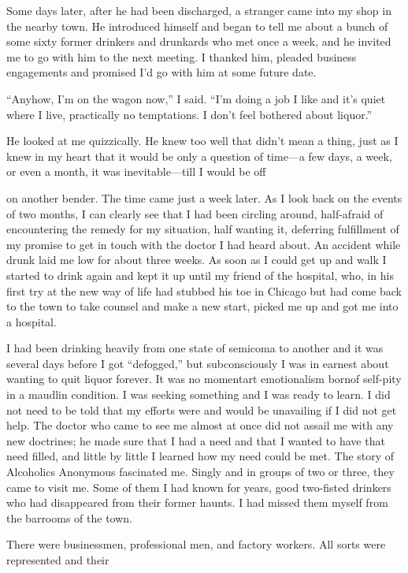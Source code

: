 Some days later, after he had been discharged, a stranger came into my shop in the nearby town. He introduced himself and began to tell me about a bunch of some sixty former drinkers and drunkards who met once a week, and he invited me to go with him to the next meeting. I thanked him, pleaded business engagements and promised I’d go with him at some future date.

“Anyhow, I’m on the wagon now,” I said. “I’m doing a job I like and it’s quiet where I live, practically no temptations. I don’t feel bothered about liquor.”

He looked at me quizzically. He knew too well that didn’t mean a thing, just as I knew in my heart that it would be only a question of time—a few days, a week, or even a month, it was inevitable—till I would be off

on another bender. The time came just a week later. As I look back on the events of two months, I can clearly see that I had been circling around, half-afraid of encountering the remedy for my situation, half wanting it, deferring fulfillment of my promise to get in touch with the doctor I had heard about. An accident while drunk laid me low for about three weeks. As soon as I could get up and walk I started to drink again and kept it up until my friend of the hospital, who, in his first try at the new way of life had stubbed his toe in Chicago but had come back to the town to take counsel and make a new start, picked me up and got me into a hospital.

I had been drinking heavily from one state of semicoma to another and it was several days before I got “defogged,” but subconsciously I was in earnest about wanting to quit liquor forever. It was no momentart emotionalism bornof self-pity in a maudlin condition. I was seeking something and I was ready to learn. I did not need to be told that my efforts were and would be unavailing if I did not get help. The doctor who came to see me almost at once did not assail me with any new doctrines; he made sure that I had a need and that I wanted to have that need filled, and little by little I learned how my need could be met. The story of Alcoholics Anonymous fascinated me. Singly and in groups of two or three, they came to visit me. Some of them I had known for years, good two-fisted drinkers who had disappeared from their former haunts. I had missed them myself from the barrooms of the town.

There were businessmen, professional men, and factory workers. All sorts were represented and their

